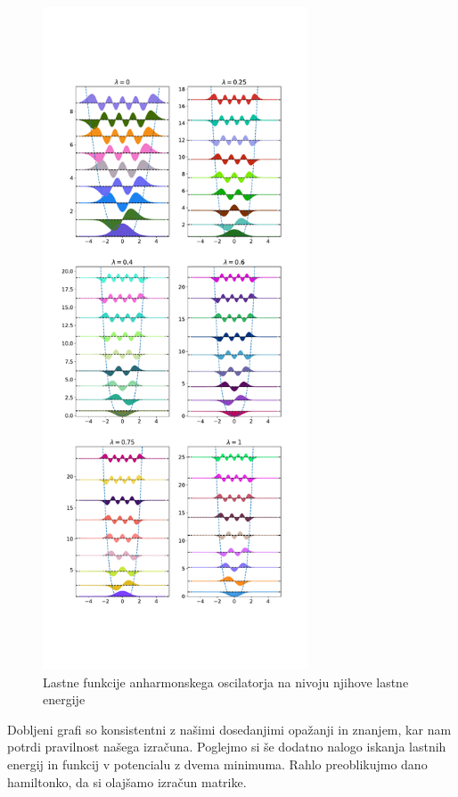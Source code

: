 \documentclass{article}
\begin{document}
\begin{figure}[H]
    \centering
	\includegraphics[width=0.7\textwidth]{eigenfunctions.pdf}
	\caption{Lastne funkcije anharmonskega oscilatorja na nivoju njihove lastne energije}
\end{figure}
Dobljeni grafi so konsistentni z našimi dosedanjimi opažanji in znanjem, kar nam potrdi pravilnost našega izračuna. Poglejmo si še dodatno nalogo iskanja lastnih energij in funkcij v potencialu z dvema minimuma. Rahlo preoblikujmo dano hamiltonko, da si olajšamo izračun matrike.
\end{document}
